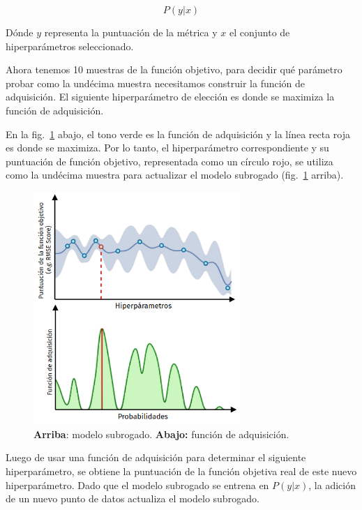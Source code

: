 \documentclass[a4paper,12pt]{article}
\begin{document}
$$ P(y|x) $$

Dónde $y$ representa la puntuación de la métrica y $x$ el conjunto de hiperparámetros seleccionado.

Ahora tenemos 10 muestras de la función objetivo, para decidir qué parámetro probar como la undécima muestra necesitamos construir la función de adquisición. El siguiente hiperparámetro de elección es donde se maximiza la función de adquisición.

En la fig.~\ref{fig:bayes9} abajo, el tono verde es la función de adquisición y la línea recta roja es donde se maximiza. Por lo tanto, el hiperparámetro correspondiente y su puntuación de función objetivo, representada como un círculo rojo, se utiliza como la undécima muestra para actualizar el modelo subrogado (fig.~\ref{fig:bayes9} arriba).

\begin{figure}[H]
	\begin{center}
		\includegraphics[width=0.7\textwidth]{bayes_opt_9_v2.png}
		\caption{\textbf{Arriba}: modelo subrogado. \textbf{Abajo:} función de adquisición.}
		\label{fig:bayes9}
	\end{center}
\end{figure}

Luego de usar una función de adquisición para determinar el siguiente hiperparámetro, se obtiene la puntuación de la función objetiva real de este nuevo hiperparámetro. Dado que el modelo subrogado se entrena en $P(y|x)$, la adición de un nuevo punto de datos actualiza el modelo subrogado.
\end{document}
